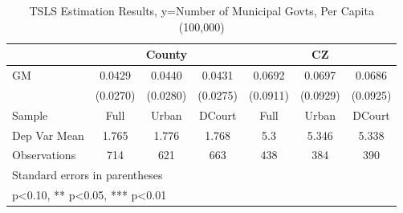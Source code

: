 \begin{table}[htbp]\centering
\def\sym#1{\ifmmode^{#1}\else\(^{#1}\)\fi}
\caption{TSLS Estimation Results, y=Number of Municipal Govts, Per Capita (100,000)}
\begin{tabular}{l*{6}{c}}
\toprule
                &\multicolumn{3}{c}{County}            &\multicolumn{3}{c}{CZ}                \\\cmidrule(lr){2-4}\cmidrule(lr){5-7}
\midrule
GM              &   0.0429   &   0.0440   &   0.0431   &   0.0692   &   0.0697   &   0.0686   \\
                & (0.0270)   & (0.0280)   & (0.0275)   & (0.0911)   & (0.0929)   & (0.0925)   \\
\midrule
Sample          &     Full   &    Urban   &   DCourt   &     Full   &    Urban   &   DCourt   \\
Dep Var Mean    &    1.765   &    1.776   &    1.768   &      5.3   &    5.346   &    5.338   \\
Observations    &      714   &      621   &      663   &      438   &      384   &      390   \\
\bottomrule
\multicolumn{7}{l}{\footnotesize Standard errors in parentheses}\\
\multicolumn{7}{l}{\footnotesize * p<0.10, ** p<0.05, *** p<0.01}\\
\end{tabular}
\end{table}
